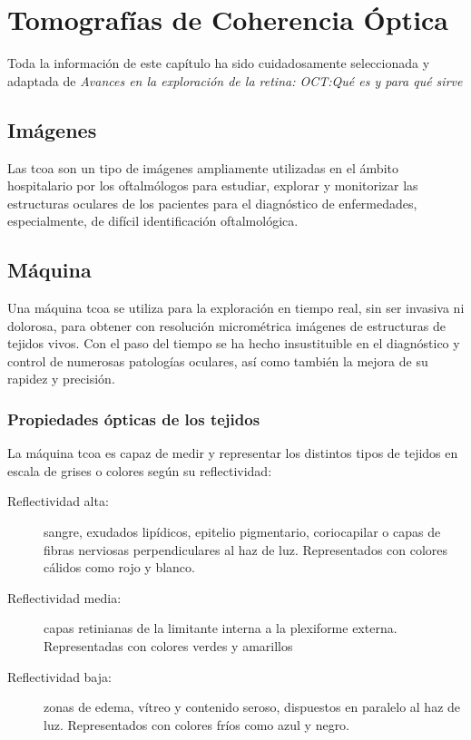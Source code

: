 \chapter{Tomografías de Coherencia Óptica}
Toda la información de este capítulo ha sido cuidadosamente
seleccionada y adaptada de \emph{Avances en la exploración de la
  retina: OCT:\@ Qué es y para qué sirve}\cite{oct-bib}

\section{Imágenes }
Las \gls{tcoa} son un tipo de imágenes ampliamente utilizadas en el
ámbito hospitalario por los oftalmólogos para estudiar, explorar y monitorizar las
estructuras oculares de los pacientes para el diagnóstico de
enfermedades, especialmente, de difícil identificación oftalmológica.

\section{Máquina }
Una máquina \gls{tcoa} se utiliza para la exploración en tiempo real, sin ser
invasiva ni dolorosa, para obtener con resolución micrométrica imágenes
de estructuras de tejidos vivos. Con el paso del tiempo se ha hecho
insustituible en el diagnóstico y control de numerosas patologías
oculares, así como también la mejora de su rapidez y precisión.

\subsection{Propiedades ópticas de los tejidos}
La máquina \gls{tcoa} es capaz de medir y representar los distintos
tipos de tejidos en escala de grises o colores según su reflectividad:
\begin{description}
\item[Reflectividad alta:] sangre, exudados lipídicos, epitelio
  pigmentario, coriocapilar o capas de fibras nerviosas
  perpendiculares al haz de luz. Representados con colores cálidos
  como rojo y blanco.
\item[Reflectividad media:] capas retinianas de la limitante interna a
  la plexiforme externa. Representadas con colores verdes y amarillos
\item[Reflectividad baja:] zonas de edema, vítreo y contenido seroso,
  dispuestos en paralelo al haz de luz. Representados con colores
  fríos como azul y negro.
\end{description}

